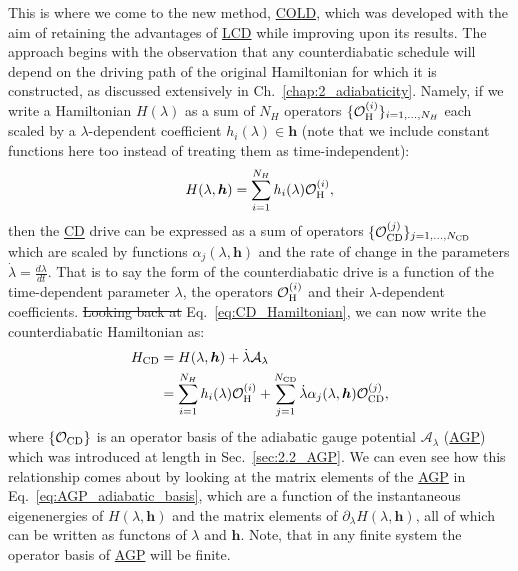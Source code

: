\documentclass[a4paper,oneside,11pt]{book}
\newcommand{\hbb}{\boldsymbol{h}}
\newcommand{\dlambda}{\partial_{\lambda}}
\newcommand{\AGP}[1]{\mathcal{A}_{#1}}
\newcommand{\dotlambda}{\dot{\lambda}}
\newcommand{\acrref}[1]{\hyperref[acr:#1]{#1}}
\providecommand{\DIFaddtex}[1]{{\protect\color{blue}\uwave{#1}}} %
\providecommand{\DIFdeltex}[1]{{\protect\color{red}\sout{#1}}}                      %
\providecommand{\DIFaddbegin}{} %
\providecommand{\DIFaddend}{} %
\providecommand{\DIFdelbegin}{} %
\providecommand{\DIFdelend}{} %
\providecommand{\DIFadd}[1]{\texorpdfstring{\DIFaddtex{#1}}{#1}} %
\providecommand{\DIFdel}[1]{\texorpdfstring{\DIFdeltex{#1}}{}} %
\newcommand{\DIFscaledelfig}{0.5}
\newlength{\DIFdelgraphicswidth} %
\newlength{\DIFdelgraphicsheight} %
\newcommand{\DIFaddincludegraphics}[2][]{{\color{blue}\fbox{\DIFOincludegraphics[#1]{#2}}}} %
\newcommand{\DIFdelincludegraphics}[2][]{%
\sbox{\DIFdelgraphicsbox}{\DIFOincludegraphics[#1]{#2}}%
\settoboxwidth{\DIFdelgraphicswidth}{\DIFdelgraphicsbox} %
\settoboxtotalheight{\DIFdelgraphicsheight}{\DIFdelgraphicsbox} %
\scalebox{\DIFscaledelfig}{%
\parbox[b]{\DIFdelgraphicswidth}{\usebox{\DIFdelgraphicsbox}\\[-\baselineskip] \rule{\DIFdelgraphicswidth}{0em}}\llap{\resizebox{\DIFdelgraphicswidth}{\DIFdelgraphicsheight}{%
\setlength{\unitlength}{\DIFdelgraphicswidth}%
\begin{picture}(1,1)%
\thicklines\linethickness{2pt} %
{\color[rgb]{1,0,0}\put(0,0){\framebox(1,1){}}}%
{\color[rgb]{1,0,0}\put(0,0){\line( 1,1){1}}}%
{\color[rgb]{1,0,0}\put(0,1){\line(1,-1){1}}}%
\end{picture}%
}\hspace*{3pt}}} %
} %
\DeclareRobustCommand{\DIFaddbegin}{\DIFOaddbegin \let\includegraphics\DIFaddincludegraphics} %
\DeclareRobustCommand{\DIFaddend}{\DIFOaddend \let\includegraphics\DIFOincludegraphics} %
\DeclareRobustCommand{\DIFdelbegin}{\DIFOdelbegin \let\includegraphics\DIFdelincludegraphics} %
\DeclareRobustCommand{\DIFdelend}{\DIFOaddend \let\includegraphics\DIFOincludegraphics} %
\begin{document}
This is where we come to the new method, \acrref{COLD}, which was developed with the aim of retaining the advantages of \acrref{LCD} while improving upon its results. The approach begins with the observation that any counterdiabatic schedule will depend on the driving path of the original Hamiltonian for which it is constructed, as discussed extensively in Ch.~\ref{chap:2_adiabaticity}. Namely, if we write a Hamiltonian $H(\lambda)$ as a sum of $N_H$ operators $\{ \mathcal{O}_{\rm H}^{(i)} \}_{i = 1,...,N_H}$ each scaled by a $\lambda$-dependent coefficient $h_i(\lambda) \in \hbb$ (note that we include constant functions here too instead of treating them as time-independent):
\begin{equation}
    H(\lambda, \hbb) = \sum_{i = 1}^{N_H} h_i(\lambda) \mathcal{O}_{\rm H}^{(i)},
\end{equation}
then the \acrref{CD} drive can be expressed as a sum of operators $\{\mathcal{O}_{\rm CD}^{(j)}\}_{j = 1,...,N_{\rm CD}}$ which are scaled by functions $\alpha_{j}(\lambda, \hbb)$ and the rate of change in the parameters $\dotlambda = \frac{d \lambda}{dt}$. That is to say the form of the counterdiabatic drive is a function of the time-dependent parameter $\lambda$, the operators $\mathcal{O}_{\rm H}^{(i)}$ and their $\lambda$-dependent coefficients. \DIFdelbegin \DIFdel{Looking back at }\DIFdelend \DIFaddbegin \DIFadd{Returning to }\DIFaddend Eq.~\eqref{eq:CD_Hamiltonian}, we can now write the counterdiabatic Hamiltonian as:
\begin{equation}\label{eq:H_cd_operators}
    \begin{aligned}
        H_{\rm CD} &= H(\lambda, \hbb) + \dotlambda \AGP{\lambda} \\
        &= \sum_{i = 1}^{N_H} h_i(\lambda) \mathcal{O}_{\rm H}^{(i)} + \sum_{j = 1}^{N_{\rm CD}} \dotlambda \alpha_{j}(\lambda, \hbb) \mathcal{O}_{\rm CD}^{(j)},
    \end{aligned}
\end{equation}
where \DIFdelbegin \DIFdel{$\{\mathcal{O}_{\rm CD}\}$ }\DIFdelend \DIFaddbegin \DIFadd{$\mathcal{O}_{\rm CD} = \{\mathcal{O}_{\rm CD}^{(j)}\}_{j = 1,...,N_{\rm CD}}$ }\DIFaddend is an operator basis of the adiabatic gauge potential $\AGP{\lambda}$ (\acrref{AGP}) which was introduced at length in Sec.~\ref{sec:2.2_AGP}. We can even see how this relationship comes about by looking at the matrix elements of the \acrref{AGP} in Eq.~\eqref{eq:AGP_adiabatic_basis}, which are a function of the instantaneous eigenenergies of $H(\lambda, \hbb)$ and the matrix elements of $\dlambda H(\lambda, \hbb)$, all of which can be written as functons of $\lambda$ and $\hbb$. Note, that in any finite system the operator basis of \acrref{AGP} will be finite.
\end{document}
